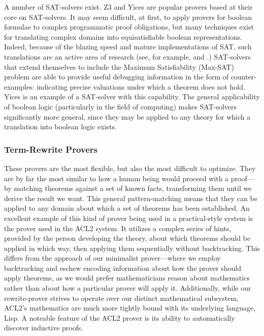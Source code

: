 A number of SAT-solvers exist.  Z3 and Yices\cite{yices} are popular provers based at their core on SAT-solvers.  It may seem difficult, at first, to apply provers for boolean formulae to complex programmatic proof obligations, but many techniques exist for translating complex domains into equisatisfiable boolean representations.  Indeed, because of the blazing speed and mature implementations of SAT, such translations are an active area of research (see, for example, \cite{ganeshArrayDecision} and \cite{sheiniIntegerDecision}.)  SAT-solvers that extend themselves to include the Maximum Satisfiability (Max-SAT) problem are able to provide useful debugging information in the form of counter-examples: indicating precise valuations under which a theorem does not hold.  Yices is an example of a SAT-solver with this capability.  The general applicability of boolean logic (particularly in the field of computing) makes SAT-solvers significantly more general, since they may be applied to any theory for which a translation into boolean logic exists.

\subsubsection{Term-Rewrite Provers}  These provers are the most flexible, but also the most difficult to optimize.  They are by far the most similar to how a human being would proceed with a proof---by matching theorems against a set of known facts, transforming them until we derive the result we want.  This general pattern-matching means that they can be applied to any domain about which a set of theorems has been established.  An excellent example of this kind of prover being used in a practical-style system is the prover used in the ACL2 system.  It utilizes a complex series of hints, provided by the person developing the theory, about which theorems should be applied in which way, then applying them sequentially without backtracking.  This differs from the approach of our minimalist prover---where we employ backtracking and eschew encoding information about how the prover should apply theorems, as we would prefer mathematicians reason about mathematics rather than about how a particular prover will apply it.  Additionally, while our rewrite-prover strives to operate over our distinct mathematical subsystem, ACL2's mathematics are much more tightly bound with its underlying language, Lisp.  A noteable feature of the ACL2 prover is its ability to automatically discover inductive proofs.

